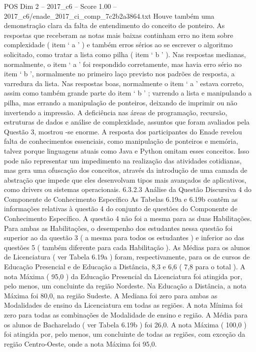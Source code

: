 \begin{textsample}{POS Dim 2 – 2017\_c6 – Score 1.00 – 2017\_c6/enade\_2017\_ci\_comp\_7c2b2a3864.txt}
Houve também uma demonstração clara da falta de entendimento do conceito de ponteiro.
As respostas que receberam as notas mais baixas continham erro no item sobre complexidade ( item ‘ a ’ ) e também erros sérios ao se escrever o algoritmo solicitado, como tratar a lista como pilha ( item ‘ b ’ ).
Nas respostas medianas, normalmente, o item ‘ a ’ foi respondido corretamente, mas havia erro sério no item ‘ b ’, normalmente no primeiro laço previsto nos padrões de resposta, a varredura da lista.
Nas respostas boas, normalmente o item ‘ a ’ estava correto, assim como também grande parte do item ‘ b ’ ; varrendo a lista e manipulando a pilha, mas errando a manipulação de ponteiros, deixando de imprimir ou não invertendo a impressão.
A deficiência nas áreas de programação, recursão, estruturas de dados e análise de complexidade, assuntos que foram avaliados pela Questão 3, mostrou -se enorme.
A resposta dos participantes do Enade revelou falta de conhecimentos essenciais, como manipulação de ponteiros e memória, talvez porque linguagens atuais como Java e Python omitam esses conceitos.
Isso pode não representar um impedimento na realização das atividades cotidianas, mas gera uma ofuscação dos conceitos, através da introdução de uma camada de abstração que impede que eles desenvolvam tipos mais avançados de aplicativos, como drivers ou sistemas operacionais. 6.3.2.3 Análise da Questão Discursiva 4 do Componente de Conhecimento Específico As Tabelas 6.19a e 6.19b contêm as informações relativas à questão 4 do conjunto de questões do Componente de Conhecimento Específico.
A questão 4 não foi a mesma para as duas Habilitações.
Para ambas as Habilitações, o desempenho dos estudantes nessa questão foi superior ao da questão 3 ( a mesma para todos os estudantes ) e inferior ao das questões 5 ( também diferente para cada Habilitação ).
As Médias para os alunos de Licenciatura ( ver Tabela 6.19a ) foram, respectivamente, para os de cursos de Educação Presencial e de Educação a Distância, 8,3 e 6,6 ( 7,8 para o total ).
A nota Máxima ( 95,0 ) da Educação Presencial da Licenciatura foi atingida por, pelo menos, um concluinte da região Nordeste.
Na Educação a Distância, a nota Máxima foi 80,0, na região Sudeste.
A Mediana foi zero para ambas as Modalidades de ensino da Licenciatura em todas as regiões.
A nota Mínima foi zero para todas as combinações de Modalidade de ensino e região.
A Média para os alunos de Bacharelado ( ver Tabela 6.19b ) foi 26,0.
A nota Máxima ( 100,0 ) foi atingida por, pelo menos, um concluinte de todas as regiões, com exceção da região Centro-Oeste, onde a nota Máxima foi 95,0.

\end{textsample}
